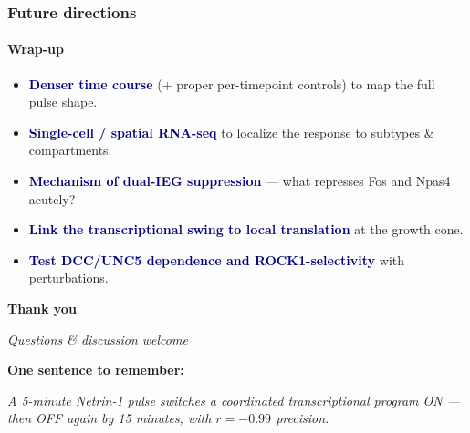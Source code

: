 \documentclass[aspectratio=169,11pt]{beamer}
\newcommand{\hi}[1]{\textcolor{navy}{\textbf{#1}}}
\begin{document}
\begin{frame}
  \frametitle{Future directions}\framesubtitle{Wrap-up}
  \begin{itemize}\setlength\itemsep{10pt}
    \item \hi{Denser time course} (+ proper per-timepoint controls) to map the full pulse shape.
    \item \hi{Single-cell / spatial RNA-seq} to localize the response to subtypes \& compartments.
    \item \hi{Mechanism of dual-IEG suppression} --- what represses Fos and Npas4 acutely?
    \item \hi{Link the transcriptional swing to local translation} at the growth cone.
    \item \hi{Test DCC/UNC5 dependence and ROCK1-selectivity} with perturbations.
  \end{itemize}
\end{frame}

{
\begin{frame}[plain]
  \vskip0.3cm
  {\color{white}\Huge\bfseries Thank you}\par\vskip12pt
  {\color{teal!50!white}\large\itshape Questions \& discussion welcome}\par
  \vskip30pt
  {\color{white!60!navy}\footnotesize\bfseries One sentence to remember:}\par
  {\color{white}\normalsize\itshape A 5-minute Netrin-1 pulse switches a coordinated
   transcriptional program ON --- then OFF again by 15 minutes, with $r=-0.99$ precision.}\par
\end{frame}}
\end{document}

